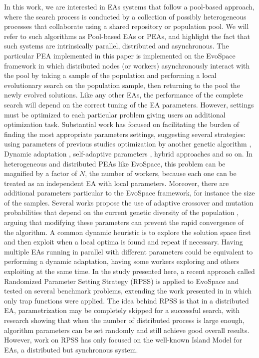 \documentclass{llncs}
\begin{document}
In this work, we are interested in EAs systems that follow a
pool-based approach, where the search process is conducted by a
collection of possibly heterogeneous processes that collaborate using
a shared repository or population pool. We will refer to such
algorithms as Pool-based EAs or PEAs, and highlight the fact that such
systems are intrinsically parallel, distributed and asynchronous.
The particular PEA implemented in this paper is implemented on 
the EvoSpace framework  \cite{GValdez2015}
in which distributed nodes (or workers) asynchronously interact 
with the pool by taking a sample of the population and performing 
a local evolutionary search on the population sample, then returning 
to the pool the newly evolved solutions. 
Like any other EAs, the performance of the complete search will depend
on the correct tuning of the EA parameters. However, settings 
must be optimized to each particular problem \cite{de2007parameter}  
giving users an additional optimization task. 
Substantial work has focused on facilitating the burden of finding 
the most appropriate parameters settings, suggesting several strategies:
using parameters of previous studies \cite{eiben1999parameter} 
optimization by another genetic algorithm \cite{grefenstette1986optimization}, Dynamic adaptation \cite{eiben1999parameter}, 
self-adaptive parameters \cite{pellerin2004self}, hybrid approaches and so on.
In heterogeneous and distributed PEAs like EvoSpace, this problem can 
be magnified by a factor of $N$, the number of workers, because each one
can be treated as an independent EA with local parameters. Moreover, there
are additional parameters particular to the EvoSpace framework, 
for instance the size of the samples.
Several works propose the use of adaptive crossover and mutation probabilities
that depend on the current genetic diversity of the population \cite{pellerin2004self},
arguing that modifying these parameters can prevent the rapid convergence of the 
algorithm. 
A common dynamic heuristic is to explore the solution space first and then exploit
when a local optima is found and repeat if necessary.  
Having multiple EAs running in parallel with different parameters could be 
equivalent to performing a dynamic adaptation, having some workers exploring
and others exploiting at the same time. 
In the study presented here, a recent approach called Randomized Parameter
Setting Strategy (RPSS) \cite{fuku1,fuku2} is applied to EvoSpace and tested on 
several benchmark problems, extending the work presented in \cite{garcia2014randomized} 
in which only trap functions were applied.
The idea behind RPSS is that in a distributed EA, parametrization may be
completely skipped for a successful search, with research showing that when the 
number of distributed process is large enough, algorithm parameters can be set 
randomly and still achieve good overall results. However, work on RPSS has 
only focused on the well-known Island Model for EAs, a distributed but synchronous system.
\end{document}
